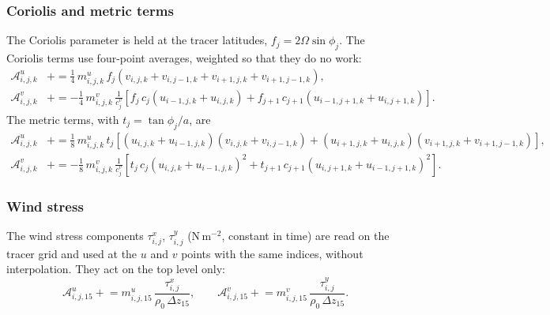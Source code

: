\documentclass{article}
\begin{document}
\subsubsection*{Coriolis and metric terms}
The Coriolis parameter is held at the tracer latitudes, $f_j = 2\Omega\sin\phi_j$.
The Coriolis terms use four-point averages, weighted so that they do no work:
\begin{align*}
\mathcal{A}^u_{i,j,k} &\mathrel{+}= \tfrac14\, m^u_{i,j,k}\, f_j \left( v_{i,j,k} + v_{i,j-1,k} + v_{i+1,j,k} + v_{i+1,j-1,k} \right), \\
\mathcal{A}^v_{i,j,k} &\mathrel{+}= -\tfrac14\, m^v_{i,j,k}\, \frac{1}{c^v_j} \left[ f_j\, c_j \left( u_{i-1,j,k} + u_{i,j,k} \right) + f_{j+1}\, c_{j+1} \left( u_{i-1,j+1,k} + u_{i,j+1,k} \right) \right].
\end{align*}
The metric terms, with $t_j = \tan\phi_j/a$, are
\begin{align*}
\mathcal{A}^u_{i,j,k} &\mathrel{+}= \tfrac18\, m^u_{i,j,k}\, t_j \left[ (u_{i,j,k} + u_{i-1,j,k})(v_{i,j,k} + v_{i,j-1,k}) + (u_{i+1,j,k} + u_{i,j,k})(v_{i+1,j,k} + v_{i+1,j-1,k}) \right], \\
\mathcal{A}^v_{i,j,k} &\mathrel{+}= -\tfrac18\, m^v_{i,j,k}\, \frac{1}{c^v_j} \left[ t_j\, c_j \left( u_{i,j,k} + u_{i-1,j,k} \right)^2 + t_{j+1}\, c_{j+1} \left( u_{i,j+1,k} + u_{i-1,j+1,k} \right)^2 \right].
\end{align*}

\subsubsection*{Wind stress}
The wind stress components $\tau^x_{i,j}$, $\tau^y_{i,j}$ (N\,m$^{-2}$, constant in time) are read on the tracer grid and used at the $u$ and $v$ points with the same indices, without interpolation. They act on the top level only:
\[
\mathcal{A}^u_{i,j,15} \mathrel{+}= m^u_{i,j,15}\,\frac{\tau^x_{i,j}}{\rho_0\,\Delta z_{15}},
\qquad
\mathcal{A}^v_{i,j,15} \mathrel{+}= m^v_{i,j,15}\,\frac{\tau^y_{i,j}}{\rho_0\,\Delta z_{15}}.
\]
\end{document}
